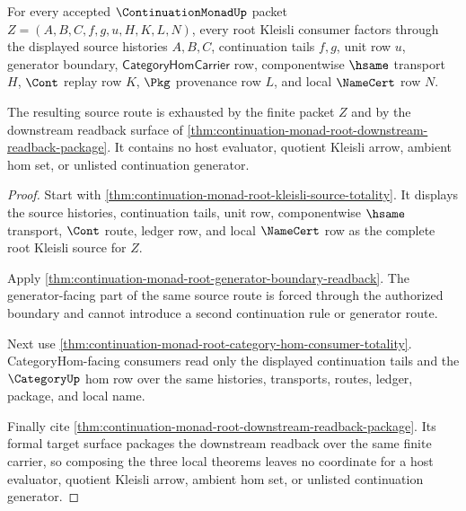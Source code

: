 \begin{theorem}
\label{thm:continuation-monad-root-kleisli-source-route-exhaustion}
For every accepted $\ContinuationMonadUp$ packet $Z=(A,B,C,f,g,u,H,K,L,N)$, every root Kleisli consumer factors through the displayed source histories $A,B,C$, continuation tails $f,g$, unit row $u$, generator boundary, $\mathsf{CategoryHomCarrier}$ row, componentwise $\hsame$ transport $H$, $\Cont$ replay row $K$, $\Pkg$ provenance row $L$, and local $\NameCert$ row $N$.

The resulting source route is exhausted by the finite packet $Z$ and by the downstream readback surface of \autoref{thm:continuation-monad-root-downstream-readback-package}. It contains no host evaluator, quotient Kleisli arrow, ambient hom set, or unlisted continuation generator.
\end{theorem}
\begin{proof}
Start with \autoref{thm:continuation-monad-root-kleisli-source-totality}. It displays the source histories, continuation tails, unit row, componentwise $\hsame$ transport, $\Cont$ route, ledger row, and local $\NameCert$ row as the complete root Kleisli source for $Z$.

Apply \autoref{thm:continuation-monad-root-generator-boundary-readback}. The generator-facing part of the same source route is forced through the authorized boundary and cannot introduce a second continuation rule or generator route.

Next use \autoref{thm:continuation-monad-root-category-hom-consumer-totality}. CategoryHom-facing consumers read only the displayed continuation tails and the $\CategoryUp$ hom row over the same histories, transports, routes, ledger, package, and local name.

Finally cite \autoref{thm:continuation-monad-root-downstream-readback-package}. Its formal target surface packages the downstream readback over the same finite carrier, so composing the three local theorems leaves no coordinate for a host evaluator, quotient Kleisli arrow, ambient hom set, or unlisted continuation generator.
\end{proof}
